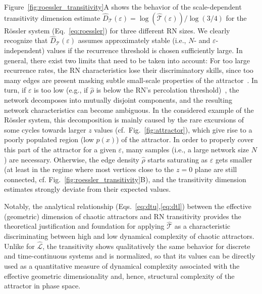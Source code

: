 Figure~\ref{fig:roessler_transitivity}A shows the behavior of the scale-dependent transitivity dimension estimate $\hat{D}_{\mathcal{T}}(\varepsilon)=\log(\hat{\mathcal{T}}(\varepsilon))/\log(3/4)$ for the R\"ossler system (Eq.~\ref{eq:roessler}) for three different RN sizes. We clearly recognize that $\hat{D}_{\mathcal{T}}(\varepsilon)$ assumes approximately stable (i.e., $N$- and $\varepsilon$-independent) values if the recurrence threshold is chosen sufficiently large. In general, there exist two limits that need to be taken into account: For too large recurrence rates, the RN characteristics lose their discriminatory skills, since too many edges are present masking subtle small-scale properties of the attractor~\cite{Donges2012PRE,Donner2010PRE}. In turn, if $\varepsilon$ is too low (e.g., if $\hat{\rho}$ is below the RN's percolation threshold)~\cite{Donges2012PRE}, the network decomposes into mutually disjoint components, and the resulting network characteristics can become ambiguous. In the considered example of the R\"ossler system, this decomposition is mainly caused by the rare excursions of some cycles towards larger $z$ values (cf.~Fig.~\ref{fig:attractor}), which give rise to a poorly populated region (low $p(x)$) of the attractor. In order to properly cover this part of the attractor for a given $\varepsilon$, many samples (i.e., a large network size $N$) are necessary. Otherwise, the edge density $\hat{\rho}$ starts saturating as $\varepsilon$ gets smaller (at least in the regime where most vertices close to the $z=0$ plane are still connected, cf. Fig.~\ref{fig:roessler_transitivity}B), and the transitivity dimension estimates strongly deviate from their expected values.

Notably, the analytical relationship (Eqs.~\ref{eq:dtu},\ref{eq:dtl}) between the effective (geometric) dimension of chaotic attractors and RN transitivity provides the theoretical justification and foundation for applying $\hat{\mathcal{T}}$ as a characteristic discriminating between high and low dynamical complexity of chaotic attractors. Unlike for $\hat{\mathcal{L}}$, the transitivity shows qualitatively the same behavior for discrete and time-continuous systems and is normalized, so that its values can be directly used as a quantitative measure of dynamical complexity associated with the effective geometric dimensionality and, hence, structural complexity of the attractor in phase space.


        
